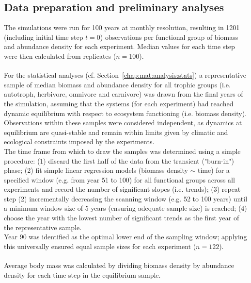 \subsection{Data preparation and preliminary analyses}
The simulations were run for 100 years at monthly resolution, resulting in 1201 (including initial time step $t = 0$) observations per functional group of biomass and abundance density for each experiment. Median values for each time step were then calculated from replicates ($n = 100$). 
\\\\
For the statistical analyses (cf. Section~\ref{chap:mat:analysis:stats}) a representative sample of median biomass and abundance density for all trophic groups (i.e. autotroph, herbivore, omnivore and carnivore) was drawn from the final years of the simulation, assuming that the systems (for each experiment) had reached dynamic equilibrium with respect to ecosystem functioning (i.e. biomass density). 
Observations within these samples were considered independent, as dynamics at equilibrium are quasi-stable and remain within limits given by climatic and ecological constraints imposed by the experiments. \\
The time frame from which to draw the samples was determined using a simple procedure: (1) discard the first half of the data from the transient ("burn-in") phase; (2) fit simple linear regression models (biomass density $\sim$ time) for a specified window (e.g. from year 51 to 100) for all functional groups  across all experiments and record the number of significant slopes (i.e. trends); (3) repeat step (2) incrementally decreasing the scanning window (e.g. 52 to 100 years) until a minimum window size of 5 years (ensuring adequate sample size) is reached; (4) choose the year with the lowest number of significant trends as the first year of the representative sample.\\
Year 90 was  identified as the optimal lower end of the sampling window; applying this universally ensured equal sample sizes for each experiment ($n = 122$).\\\\
Average body mass was calculated by dividing  biomass density by abundance density for each time step in the equilibrium sample.

